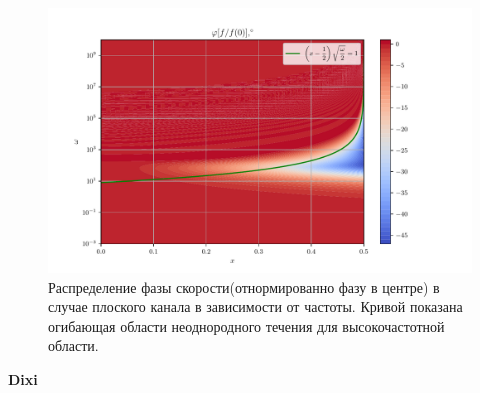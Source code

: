 \documentclass[a4paper,12pt]{article}
\theoremstyle{plain} %
\theoremstyle{definition} %
\theoremstyle{remark} %
\begin{document}
\begin{figure}[H]
    \centering
    \includegraphics[]{Phase pic plane.pdf}
    \caption{Распределение фазы скорости(отнормированно фазу в центре) в случае плоского канала в зависимости от частоты. Кривой показана огибающая области неоднородного течения для высокочастотной области.}
    \label{fig:abs plane pic}
\end{figure}
\begin{flushright}
\Large \textbf{Dixi}
\end{flushright}
\end{document}
